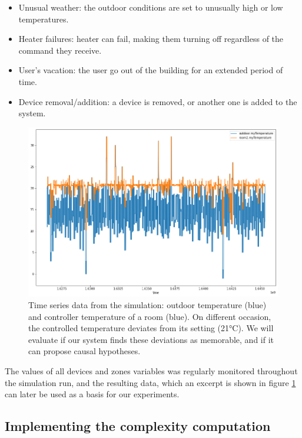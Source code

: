 \documentclass[conference]{IEEEtran}
\begin{document}
\begin{itemize}
    \item Unusual weather: the outdoor conditions are set to unusually high or
        low temperatures.
    \item Heater failures: heater can fail, making them turning off regardless
        of the command they receive.
    \item User's vacation: the user go out of the building for an extended
        period of time.
    \item Device removal/addition: a device is removed, or another one is added
        to the system.
\end{itemize}


\begin{figure}[ht]
  \includegraphics[width=\linewidth]{figures/ts_example}
  \caption{Time series data from the simulation: outdoor temperature (blue) and
    controller temperature of a room (blue). On different occasion, the
    controlled temperature deviates from its setting (21°C). We will evaluate if
  our system finds these deviations as memorable, and if it can propose causal
  hypotheses.}
  \label{fig:ts_example}
\end{figure}

The values of all devices and zones variables was regularly monitored throughout
the simulation run, and the resulting data, which an excerpt is shown in figure
\ref{fig:ts_example} can later be used as a basis for our experiments.


\subsection{Implementing the complexity computation}
\end{document}
